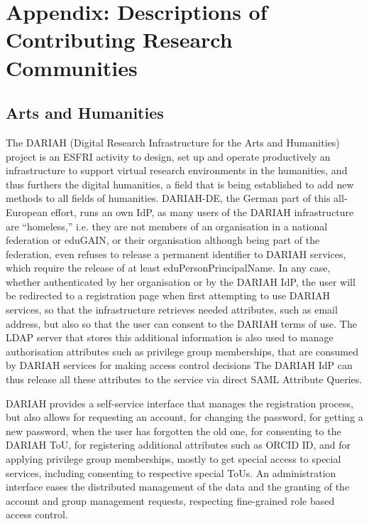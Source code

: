 \documentclass[fleqn,10pt]{wlscirep}
\begin{document}
{\appendix
\newpage



\newpage
\section{Appendix: Descriptions of Contributing Research Communities}

\subsection{Arts and Humanities}
The DARIAH (Digital Research Infrastructure for the Arts and Humanities)\cite{dariah} project is an ESFRI activity to design, set up and operate productively an infrastructure to support virtual research environments in the humanities, and thus furthers the digital humanities, a field that is being established to add new methods to all fields of humanities. DARIAH-DE, the German part of this all-European effort, runs an own IdP, as many users of the DARIAH infrastructure are “homeless,” i.e. they are not members of an organisation in a national federation or eduGAIN, or their organisation although being part of the federation, even refuses to release a permanent identifier to DARIAH services, which require the release of at least eduPersonPrincipalName. In any case, whether authenticated by her organisation or by the DARIAH IdP, the user will be redirected to a registration page when first attempting to use DARIAH services, so that the infrastructure retrieves needed attributes, such as email address, but also so that the user can consent to the DARIAH terms of use. The LDAP server that stores this additional information is also used to manage authorisation attributes such as privilege group memberships, that are consumed by DARIAH services for making access control decisions The DARIAH IdP can thus release all these attributes to the service via direct SAML Attribute Queries.

DARIAH provides a self-service interface that manages the registration process, but also allows for requesting an account, for changing the password, for getting a new password, when the user has forgotten the old one, for consenting to the DARIAH ToU, for registering additional attributes such as ORCID ID, and for applying privilege group memberships, mostly to get special access to special services, including consenting to respective special ToUs. An administration interface eases the distributed management of the data and the granting of the account and group management requests, respecting fine-grained role based access control.

}
\end{document}
